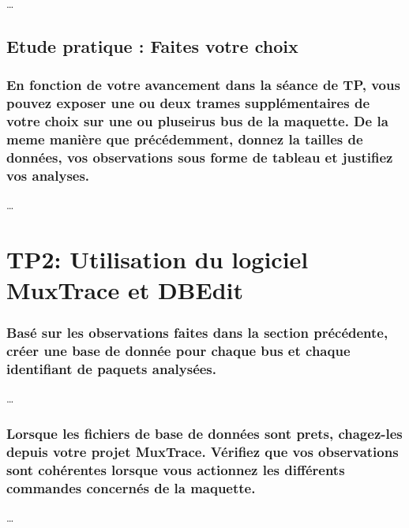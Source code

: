 \documentclass{rapportECC}
\begin{document}
\dots


\subsection{Etude pratique : Faites votre choix}

\subsubsection*{En fonction de votre avancement dans la séance de TP, vous pouvez exposer une ou deux trames supplémentaires de votre choix sur une ou pluseirus bus de la maquette. De la meme manière que précédemment, donnez la tailles de données, vos observations sous forme de tableau et justifiez vos analyses.}

\dots


\section{TP2: Utilisation du logiciel MuxTrace et DBEdit}

\subsubsection*{Basé sur les observations faites dans la section précédente, créer une base de donnée pour chaque bus et chaque identifiant de paquets analysées.}

\dots

\subsubsection*{Lorsque les fichiers de base de données sont prets, chagez-les depuis votre projet MuxTrace. Vérifiez que vos observations sont cohérentes lorsque vous actionnez les différents commandes concernés de la maquette.}

\dots
\end{document}
